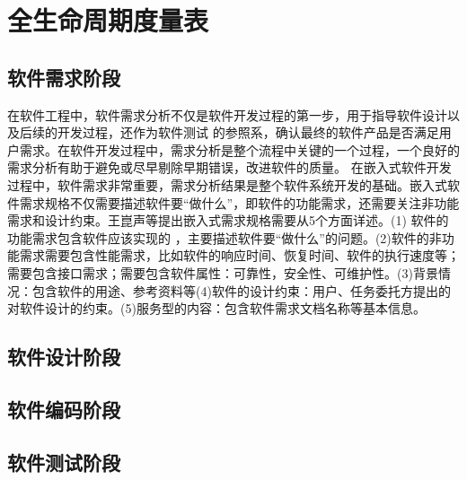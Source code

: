 \section{全生命周期度量表}

\subsection{软件需求阶段}
在软件工程中，软件需求分析不仅是软件开发过程的第一步，用于指导软件设计以及后续的开发过程，还作为软件测试
的参照系，确认最终的软件产品是否满足用户需求。在软件开发过程中，需求分析是整个流程中关键的一个过程，一个良好的需求分析有助于避免或尽早剔除早期错误，改进软件的质量。
在嵌入式软件开发过程中，软件需求非常重要，需求分析结果是整个软件系统开发的基础。嵌入式软件需求规格不仅需要描述软件要“做什么”，即软件的功能需求，还需要关注非功能需求和设计约束。王崑声等\cite{王崑声2015嵌入式软件安全保证技术}提出嵌入式需求规格需要从5个方面详述。(1) 软件的功能需求包含软件应该实现的 ，主要描述软件要“做什么”的问题。(2)软件的非功能需求需要包含性能需求，比如软件的响应时间、恢复时间、软件的执行速度等；需要包含接口需求；需要包含软件属性：可靠性，安全性、可维护性。(3)背景情况：包含软件的用途、参考资料等(4)软件的设计约束：用户、任务委托方提出的对软件设计的约束。(5)服务型的内容：包含软件需求文档名称等基本信息。

\subsection{软件设计阶段}
\subsection{软件编码阶段}
\subsection{软件测试阶段}


